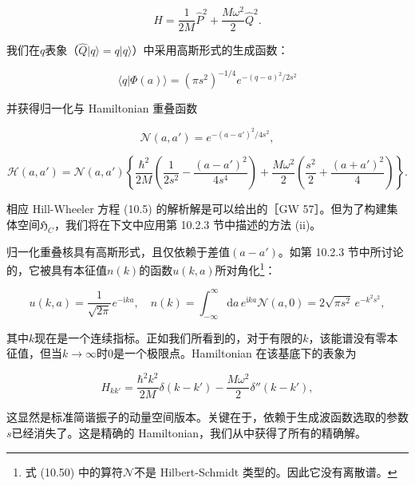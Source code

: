 \begin{equation}
H=\frac{1}{2M}\hat{P}^{2}+\frac{M\omega^{2}}{2}\hat{Q}^{2}.\label{eq:ho_hamiltonian}
\end{equation}

我们在$q$表象（$\hat{Q}|q\rangle=q|q\rangle$）中采用高斯形式的生成函数：

\begin{equation}
\langle q|\Phi(a)\rangle=(\pi s^{2})^{-1/4}e^{-(q-a)^{2}/2s^{2}}\label{eq:ho_gaussian_generating_function}
\end{equation}

并获得归一化与 Hamiltonian 重叠函数

\begin{equation}
\mathscr{N}(a,a')=e^{-(a-a')^{2}/4s^{2}},\label{eq:ho_norm_overlap}
\end{equation}

\begin{equation}
\mathscr{H}(a,a')=\mathscr{N}(a,a')\left\{ \frac{\hbar^{2}}{2M}\left(\frac{1}{2s^{2}}-\frac{(a-a')^{2}}{4s^{4}}\right)+\frac{M\omega^{2}}{2}\left(\frac{s^{2}}{2}+\frac{(a+a')^{2}}{4}\right)\right\} .\label{eq:ho_hamiltonian_overlap}
\end{equation}

相应 Hill-Wheeler 方程 (10.5) 的解析解是可以给出的［GW 57］。但为了构建集体空间$\mathfrak{H}_{C}$，我们将在下文中应用第
10.2.3 节中描述的方法 (ii)。

归一化重叠核具有高斯形式，且仅依赖于差值$(a-a')$。如第 10.2.3 节中所讨论的，它被具有本征值$n(k)$的函数$u(k,a)$所对角化\footnote{式 (10.50) 中的算符$\mathscr{N}$不是 Hilbert-Schmidt 类型的。因此它没有离散谱。}：

\begin{equation}
u(k,a)=\frac{1}{\sqrt{2\pi}}e^{-\mathrm{i}ka},\quad n(k)=\int^{\infty}_{-\infty}\mathrm{d}a\,e^{\mathrm{i}ka}\mathscr{N}(a,0)=2\sqrt{\pi s^{2}}\,e^{-k^{2}s^{2}},\label{eq:ho_norm_diagonalization}
\end{equation}

其中$k$现在是一个连续指标。正如我们所看到的，对于有限的$k$，该能谱没有零本征值，但当$k\to\infty$时$0$是一个极限点。Hamiltonian
在该基底下的表象为

\begin{equation}
H_{kk'}=\frac{\hbar^{2}k^{2}}{2M}\delta(k-k')-\frac{M\omega^{2}}{2}\delta''(k-k'),\label{eq:ho_hamiltonian_k_space}
\end{equation}

这显然是标准简谐振子的动量空间版本。关键在于，依赖于生成波函数选取的参数$s$已经消失了。这是精确的 Hamiltonian，我们从中获得了所有的精确解。

